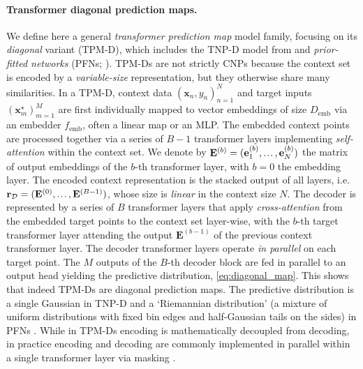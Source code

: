 \documentclass[twoside]{article}
\newcommand{\e}{\mathbf{e}}
\newcommand{\E}{\mathbf{E}}
\renewcommand{\r}{\mathbf{r}}
\renewcommand{\ldots}{\mathinner{.\mkern1.5mu.\mkern1.5mu.}}
\newcommand{\x}{\mathbf{x}}
\newcommand{\data}{\mathcal{D}}
\newcommand{\xt}{\mathbf{x}^\star}
\newcommand{\rt}{\mathbf{r}^\star}
\begin{document}
\vspace{-0.25em}
\paragraph{Transformer diagonal prediction maps.} We define here a general \emph{transformer prediction map} model family, focusing on its \emph{diagonal} variant (TPM-D), which includes the TNP-D model from \citet{nguyen2022transformer} and \emph{prior-fitted networks} (PFNs; \citealp{muller2022transformers}). TPM-Ds are not strictly CNPs because the context set is encoded by a \emph{variable-size} representation, but they otherwise share many similarities.
In a TPM-D, context data $(\x_n, y_n)_{n=1}^N$ and target inputs $(\xt_m)_{m=1}^M$ are first individually mapped to vector embeddings of size $D_\text{emb}$ via an embedder $f_\text{emb}$, often a linear map or an MLP. The embedded context points are processed together via a series of $B-1$ transformer layers implementing \emph{self-attention} within the context set. We denote by $\E^{(b)} = (\e_1^{(b)}, \ldots, \e_N^{(b)})$ the matrix of output embeddings of the $b$-th transformer layer, with $b=0$ the embedding layer. The encoded context representation is the stacked output of all layers, i.e. $\r_{\data} = (\E^{(0)}, \ldots, \E^{(B-1)})$, whose size is \emph{linear} in the context size $N$.
The decoder is represented by a series of $B$ transformer layers that apply \emph{cross-attention} from the embedded target points to the context set layer-wise, with the $b$-th target transformer layer attending the output $\E^{(b-1)}$ of the previous context transformer layer. The decoder transformer layers operate \emph{in parallel} on each target point. The $M$ outputs of the $B$-th decoder block %
are fed in parallel to an output head yielding the predictive distribution, \cref{eq:diagonal_map}. This shows that indeed TPM-Ds are diagonal prediction maps. The predictive distribution is a single Gaussian in TNP-D \citep{nguyen2022transformer} and a `Riemannian distribution' (a mixture of uniform distributions with fixed bin edges and half-Gaussian tails on the sides) in PFNs \citep{muller2022transformers}.
While in TPM-Ds encoding is mathematically decoupled from decoding, in practice encoding and decoding are commonly implemented in parallel within a single transformer layer via masking \citep{nguyen2022transformer, muller2022transformers}. 
\end{document}
